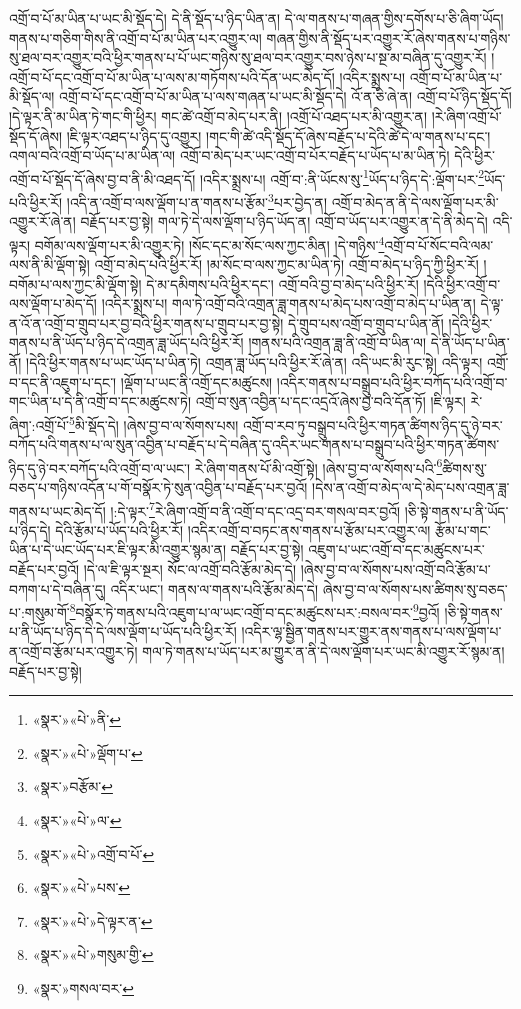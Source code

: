 འགྲོ་བ་པོ་མ་ཡིན་པ་ཡང་མི་སྡོད་དེ། དེ་ནི་སྡོད་པ་ཉིད་ཡིན་ན། དེ་ལ་གནས་པ་གཞན་གྱིས་དགོས་པ་ཅི་ཞིག་ཡོད། གནས་པ་གཅིག་གིས་ནི་འགྲོ་བ་པོ་མ་ཡིན་པར་འགྱུར་ལ། གཞན་གྱིས་ནི་སྡོད་པར་འགྱུར་རོ་ཞེས་གནས་པ་གཉིས་སུ་ཐལ་བར་འགྱུར་བའི་ཕྱིར་གནས་པ་པོ་ཡང་གཉིས་སུ་ཐལ་བར་འགྱུར་བས་ཉེས་པ་སྔ་མ་བཞིན་དུ་འགྱུར་རོ། །འགྲོ་བ་པོ་དང་འགྲོ་བ་པོ་མ་ཡིན་པ་ལས་མ་གཏོགས་པའི་དོན་ཡང་མེད་དོ། །འདིར་སྨྲས་པ། འགྲོ་བ་པོ་མ་ཡིན་པ་མི་སྡོད་ལ། འགྲོ་བ་པོ་དང་འགྲོ་བ་པོ་མ་ཡིན་པ་ལས་གཞན་པ་ཡང་མི་སྡོད་དེ། འོ་ན་ཅི་ཞེ་ན། འགྲོ་བ་པོ་ཉིད་སྡོད་དོ། །དེ་ལྟར་ནི་མ་ཡིན་ཏེ་གང་གི་ཕྱིར། གང་ཚེ་འགྲོ་བ་མེད་པར་ནི། །འགྲོ་པོ་འཐད་པར་མི་འགྱུར་ན། །རེ་ཞིག་འགྲོ་པོ་སྡོད་དོ་ཞེས། །ཇི་ལྟར་འཐད་པ་ཉིད་དུ་འགྱུར། །གང་གི་ཚེ་འདི་སྡོད་དོ་ཞེས་བརྗོད་པ་དེའི་ཚེ་དེ་ལ་གནས་པ་དང་། འགལ་བའི་འགྲོ་བ་ཡོད་པ་མ་ཡིན་ལ། འགྲོ་བ་མེད་པར་ཡང་འགྲོ་བ་པོར་བརྗོད་པ་ཡོད་པ་མ་ཡིན་ཏེ། དེའི་ཕྱིར་འགྲོ་བ་པོ་སྡོད་དོ་ཞེས་བྱ་བ་ནི་མི་འཐད་དོ། །འདིར་སྨྲས་པ། འགྲོ་བ་:ནི་ཡོངས་སུ་\footnote{«སྣར་»«པེ་»ནི་}ཡོད་པ་ཉིད་དེ་:ལྡོག་པར་\footnote{«སྣར་»«པེ་»ལྡོག་པ་}ཡོད་པའི་ཕྱིར་རོ། །འདི་ན་འགྲོ་བ་ལས་ལྡོག་པ་ན་གནས་པ་རྩོམ་\footnote{«སྣར་»བརྩོམ་}པར་བྱེད་ན། འགྲོ་བ་མེད་ན་ནི་དེ་ལས་ལྡོག་པར་མི་འགྱུར་རོ་ཞེ་ན། བརྗོད་པར་བྱ་སྟེ། གལ་ཏེ་དེ་ལས་ལྡོག་པ་ཉིད་ཡོད་ན། འགྲོ་བ་ཡོད་པར་འགྱུར་ན་དེ་ནི་མེད་དེ། འདི་ལྟར། བགོམ་ལས་ལྡོག་པར་མི་འགྱུར་ཏེ། །སོང་དང་མ་སོང་ལས་ཀྱང་མིན། །དེ་གཉིས་\footnote{«སྣར་»«པེ་»ལ་}འགྲོ་བ་པོ་སོང་བའི་ལམ་ལས་ནི་མི་ལྡོག་སྟེ། འགྲོ་བ་མེད་པའི་ཕྱིར་རོ། །མ་སོང་བ་ལས་ཀྱང་མ་ཡིན་ཏེ། འགྲོ་བ་མེད་པ་ཉིད་ཀྱི་ཕྱིར་རོ། །བགོམ་པ་ལས་ཀྱང་མི་ལྡོག་སྟེ། དེ་མ་དམིགས་པའི་ཕྱིར་དང་། འགྲོ་བའི་བྱ་བ་མེད་པའི་ཕྱིར་རོ། །དེའི་ཕྱིར་འགྲོ་བ་ལས་ལྡོག་པ་མེད་དོ། །འདིར་སྨྲས་པ། གལ་ཏེ་འགྲོ་བའི་འགྲན་ཟླ་གནས་པ་མེད་པས་འགྲོ་བ་མེད་པ་ཡིན་ན། དེ་ལྟ་ན་འོ་ན་འགྲོ་བ་གྲུབ་པར་བྱ་བའི་ཕྱིར་གནས་པ་གྲུབ་པར་བྱ་སྟེ། དེ་གྲུབ་པས་འགྲོ་བ་གྲུབ་པ་ཡིན་ནོ། །དེའི་ཕྱིར་གནས་པ་ནི་ཡོད་པ་ཉིད་དེ་འགྲན་ཟླ་ཡོད་པའི་ཕྱིར་རོ། །གནས་པའི་འགྲན་ཟླ་ནི་འགྲོ་བ་ཡིན་ལ། དེ་ནི་ཡོད་པ་ཡིན་ནོ། །དེའི་ཕྱིར་གནས་པ་ཡང་ཡོད་པ་ཡིན་ཏེ། འགྲན་ཟླ་ཡོད་པའི་ཕྱིར་རོ་ཞེ་ན། འདི་ཡང་མི་རུང་སྟེ། འདི་ལྟར། འགྲོ་བ་དང་ནི་འཇུག་པ་དང་། །ལྡོག་པ་ཡང་ནི་འགྲོ་དང་མཚུངས། །འདིར་གནས་པ་བསྒྲུབ་པའི་ཕྱིར་བཀོད་པའི་འགྲོ་བ་གང་ཡིན་པ་དེ་ནི་འགྲོ་བ་དང་མཚུངས་ཏེ། འགྲོ་བ་སུན་འབྱིན་པ་དང་འདྲའོ་ཞེས་བྱ་བའི་དོན་ཏོ། །ཇི་ལྟར། རེ་ཞིག་:འགྲོ་པོ་\footnote{«སྣར་»«པེ་»འགྲོ་བ་པོ་}མི་སྡོད་དེ། །ཞེས་བྱ་བ་ལ་སོགས་པས། འགྲོ་བ་རབ་ཏུ་བསྒྲུབ་པའི་ཕྱིར་གཏན་ཚིགས་ཉིད་དུ་ཉེ་བར་བཀོད་པའི་གནས་པ་ལ་སུན་འབྱིན་པ་བརྗོད་པ་དེ་བཞིན་དུ་འདིར་ཡང་གནས་པ་བསྒྲུབ་པའི་ཕྱིར་གཏན་ཚིགས་ཉིད་དུ་ཉེ་བར་བཀོད་པའི་འགྲོ་བ་ལ་ཡང་། རེ་ཞིག་གནས་པོ་མི་འགྲོ་སྟེ། །ཞེས་བྱ་བ་ལ་སོགས་པའི་\footnote{«སྣར་»«པེ་»པས་}ཚིགས་སུ་བཅད་པ་གཉིས་འདོན་པ་གོ་བསྣོར་ཏེ་སུན་འབྱིན་པ་བརྗོད་པར་བྱའོ། །དེས་ན་འགྲོ་བ་མེད་ལ་དེ་མེད་པས་འགྲན་ཟླ་གནས་པ་ཡང་མེད་དོ། །:དེ་ལྟར་\footnote{«སྣར་»«པེ་»དེ་ལྟར་ན་}རེ་ཞིག་འགྲོ་བ་ནི་འགྲོ་བ་དང་འདྲ་བར་གསལ་བར་བྱའོ། །ཅི་སྟེ་གནས་པ་ནི་ཡོད་པ་ཉིད་དེ། དེའི་རྩོམ་པ་ཡོད་པའི་ཕྱིར་རོ། །འདིར་འགྲོ་བ་བཏང་ནས་གནས་པ་རྩོམ་པར་འགྱུར་ལ། རྩོམ་པ་གང་ཡིན་པ་དེ་ཡང་ཡོད་པར་ཇི་ལྟར་མི་འགྱུར་སྙམ་ན། བརྗོད་པར་བྱ་སྟེ། འཇུག་པ་ཡང་འགྲོ་བ་དང་མཚུངས་པར་བརྗོད་པར་བྱའོ། །དེ་ལ་ཇི་ལྟར་སྔར། སོང་ལ་འགྲོ་བའི་རྩོམ་མེད་དེ། །ཞེས་བྱ་བ་ལ་སོགས་པས་འགྲོ་བའི་རྩོམ་པ་བཀག་པ་དེ་བཞིན་དུ། འདིར་ཡང་། གནས་ལ་གནས་པའི་རྩོམ་མེད་དེ། ཞེས་བྱ་བ་ལ་སོགས་པས་ཚིགས་སུ་བཅད་པ་:གསུམ་གོ་\footnote{«སྣར་»«པེ་»གསུམ་གྱི་}བསྣོར་ཏེ་གནས་པའི་འཇུག་པ་ལ་ཡང་འགྲོ་བ་དང་མཚུངས་པར་:བསལ་བར་\footnote{«སྣར་»གསལ་བར་}བྱའོ། །ཅི་སྟེ་གནས་པ་ནི་ཡོད་པ་ཉིད་དེ་དེ་ལས་ལྡོག་པ་ཡོད་པའི་ཕྱིར་རོ། །འདིར་ལྷ་སྦྱིན་གནས་པར་གྱུར་ནས་གནས་པ་ལས་ལྡོག་པ་ན་འགྲོ་བ་རྩོམ་པར་འགྱུར་ཏེ། གལ་ཏེ་གནས་པ་ཡོད་པར་མ་གྱུར་ན་ནི་དེ་ལས་ལྡོག་པར་ཡང་མི་འགྱུར་རོ་སྙམ་ན། བརྗོད་པར་བྱ་སྟེ། 